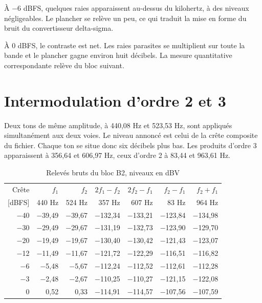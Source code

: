 
À $-$6 dBFS, quelques raies apparaissent au-dessus du kilohertz, à des niveaux négligeables. Le plancher se relève un peu, ce qui traduit la mise en forme du bruit du convertisseur delta-sigma.


À 0 dBFS, le contraste est net. Les raies parasites se multiplient sur toute la bande et le plancher gagne environ huit décibels. La mesure quantitative correspondante relève du bloc suivant.

\section{Intermodulation d'ordre 2 et 3}
\label{ann:imd:b2}

Deux tons de même amplitude, à 440,08 Hz et 523,53 Hz, sont appliqués simultanément aux deux voies. Le niveau annoncé est celui de la crête composite du fichier. Chaque ton se situe donc six décibels plus bas. Les produits d'ordre 3 apparaissent à 356,64 et 606,97 Hz, ceux d'ordre 2 à 83,44 et 963,61 Hz.

\begin{table}[H]
    \centering
    \caption{Relevés bruts du bloc B2, niveaux en dBV}
    \label{tab:imd_b2_brut}
    \small
    \begin{tabular}{rrrrrrr}
        \toprule
        Crête    & $f_1$    & $f_2$    & $2f_1 - f_2$ & $2f_2 - f_1$ & $f_2 - f_1$ & $f_2 + f_1$ \\
        {[dBFS]} & 440 Hz   & 524 Hz   & 357 Hz       & 607 Hz       & 83 Hz       & 964 Hz      \\
        \midrule
        $-$40    & $-$39,49 & $-$39,67 & $-$132,34    & $-$133,21    & $-$123,84   & $-$134,98   \\
        $-$30    & $-$29,49 & $-$29,67 & $-$131,19    & $-$132,73    & $-$123,90   & $-$129,70   \\
        $-$20    & $-$19,49 & $-$19,67 & $-$130,40    & $-$130,42    & $-$121,43   & $-$123,07   \\
        $-$12    & $-$11,49 & $-$11,67 & $-$121,72    & $-$122,29    & $-$116,51   & $-$116,82   \\
        $-$6     & $-$5,48  & $-$5,67  & $-$112,24    & $-$112,52    & $-$112,61   & $-$112,28   \\
        $-$3     & $-$2,48  & $-$2,67  & $-$110,25    & $-$110,27    & $-$121,15   & $-$122,08   \\
        0        & 0,52     & 0,33     & $-$114,91    & $-$114,57    & $-$107,56   & $-$107,59   \\
        \bottomrule
    \end{tabular}
\end{table}

